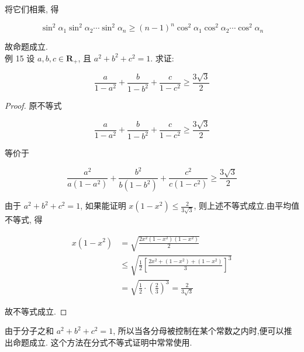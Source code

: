 \begin{example}
	将它们相乘, 得
	
	$$
	\sin ^{2} \alpha_{1} \sin ^{2} \alpha_{2} \cdots \sin ^{2} \alpha_{n} \geqslant(n-1)^{n} \cos ^{2} \alpha_{1} \cos ^{2} \alpha_{2} \cdots \cos ^{2} \alpha_{n}
	$$
	
	故命题成立.\\
	例 15 设 $a, b, c \in \mathbf{R}_{+}$, 且 $a^{2}+b^{2}+c^{2}=1$. 求证:
	
	$$
	\frac{a}{1-a^{2}}+\frac{b}{1-b^{2}}+\frac{c}{1-c^{2}} \geqslant \frac{3 \sqrt{3}}{2}
	$$
\end{example}
\begin{proof}
	原不等式
	
	$$
	\frac{a}{1-a^{2}}+\frac{b}{1-b^{2}}+\frac{c}{1-c^{2}} \geqslant \frac{3 \sqrt{3}}{2}
	$$
	
	等价于
	
	$$
	\frac{a^{2}}{a\left(1-a^{2}\right)}+\frac{b^{2}}{b\left(1-b^{2}\right)}+\frac{c^{2}}{c\left(1-c^{2}\right)} \geqslant \frac{3 \sqrt{3}}{2}
	$$
	
	由于 $a^{2}+b^{2}+c^{2}=1$, 如果能证明 $x\left(1-x^{2}\right) \leqslant \frac{2}{3 \sqrt{3}}$, 则上述不等式成立.由平均值不等式, 得
	
	$$
	\begin{aligned}
	x\left(1-x^{2}\right) & =\sqrt{\frac{2 x^{2}\left(1-x^{2}\right)\left(1-x^{2}\right)}{2}} \\
	& \leqslant \sqrt{\frac{1}{2}\left[\frac{2 x^{2}+\left(1-x^{2}\right)+\left(1-x^{2}\right)}{3}\right]^{3}} \\
	& =\sqrt{\frac{1}{2} \cdot\left(\frac{2}{3}\right)^{3}}=\frac{2}{3 \sqrt{3}}
	\end{aligned}
	$$
	
	故不等式成立.
\end{proof}
\begin{note}
	由于分子之和 $a^{2}+b^{2}+c^{2}=1$, 所以当各分母被控制在某个常数之内时,便可以推出命题成立. 这个方法在分式不等式证明中常常使用.
\end{note}

